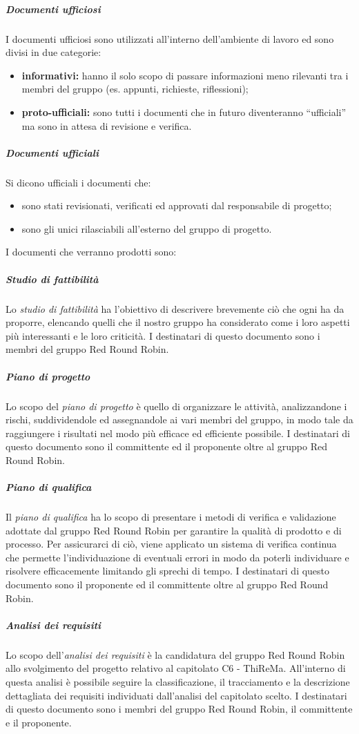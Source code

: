 				\subparagraph{Documenti ufficiosi}
					I documenti ufficiosi sono utilizzati all'interno dell'ambiente di lavoro ed sono divisi in due categorie:
					\begin{itemize}
						\item \textbf{informativi:} hanno il solo scopo di passare informazioni meno rilevanti tra i membri del gruppo (es. appunti, richieste, riflessioni);
						\item \textbf{proto-ufficiali:} sono tutti i documenti che in futuro diventeranno ``ufficiali'' ma sono in attesa di revisione e verifica.
					\end{itemize}
				\subparagraph{Documenti ufficiali}
					Si dicono ufficiali i documenti che:
					\begin{itemize}
						\item sono stati revisionati, verificati ed approvati dal responsabile di progetto;
						\item sono gli unici rilasciabili all'esterno del gruppo di progetto.
					\end{itemize}
					I documenti che verranno prodotti sono:
				\subparagraph{Studio di fattibilità}
					Lo \textit{studio di fattibilità} ha l'obiettivo di descrivere brevemente ciò che ogni  ha da proporre, elencando quelli che il nostro gruppo ha considerato come i loro aspetti più interessanti e le loro criticità. I destinatari di questo documento sono i membri del gruppo Red Round Robin.
				\subparagraph{Piano di progetto}
					Lo scopo del \textit{piano di progetto} è quello di organizzare le attività, analizzandone i rischi, suddividendole ed assegnandole ai vari membri del gruppo, in modo tale da raggiungere i risultati nel modo più efficace ed efficiente possibile. I destinatari di questo documento sono il committente ed il proponente oltre al gruppo Red Round Robin.
				\subparagraph{Piano di qualifica}
		 			Il \textit{piano di qualifica} ha lo scopo di presentare i metodi di verifica e validazione adottate dal gruppo Red Round Robin per garantire la qualità di prodotto e di processo. Per assicurarci di ciò, viene applicato un sistema di verifica continua che permette l'individuazione di eventuali errori in modo da poterli individuare e risolvere efficacemente limitando gli sprechi di tempo. I destinatari di questo documento sono il proponente ed il committente oltre al gruppo Red Round Robin.
		 		\subparagraph{Analisi dei requisiti}
		 			Lo scopo dell'\textit{analisi dei requisiti} è la candidatura del gruppo Red Round Robin allo svolgimento del progetto relativo al capitolato C6 - ThiReMa. All'interno di questa analisi è possibile seguire la classificazione, il tracciamento e la descrizione dettagliata dei requisiti individuati dall'analisi del capitolato scelto. I destinatari di questo documento sono i membri del gruppo Red Round Robin, il committente e il proponente.
